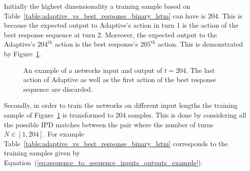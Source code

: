 Initially the highest dimensionality a training sample based on
Table~\ref{table:adaptive_vs_best_response_binary_lstm} can have is 204.
This is because the expected output to Adaptive's action in turn 1 is
the action of the best response sequence at turn 2. Moreover, the expected
output to the Adaptive's \(204^{\text{th}}\) action is the best response's
\(205^{\text{th}}\) action. This is demonstrated by
Figure~\ref{fig:input_output_example}.

\begin{figure}[!htbp]
    \centering
    
    \caption{An example of a networks input and output of \(t=204\). The last
    action of Adaptive as well as the first action of the best
    response sequence are discarded.}\label{fig:input_output_example}
\end{figure}

Secondly, in order to train the networks on different input lengths the training
sample of Figure~\ref{fig:input_output_example} is transformed to 204 samples.
This is done by considering all the possible IPD matches between
the pair where the number of turns \(N \in [1, 204]\). For example
Table~\ref{table:adaptive_vs_best_response_binary_lstm} corresponds to the
training samples given by Equation~(\ref{eq:sequence_to_sequence_inputs_outputs_example}).

